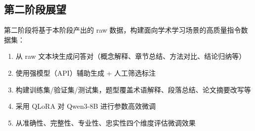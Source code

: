 \documentclass[12pt,a4paper]{ctexart}
\begin{document}
\subsection{第二阶段展望}

第二阶段将基于本阶段产出的 raw 数据，构建面向学术学习场景的高质量指令数据集：

\begin{enumerate}
    \item 从 raw 文本块生成问答对（概念解释、章节总结、方法对比、结论归纳等）
    \item 使用强模型（API）辅助生成 + 人工筛选标注
    \item 构建训练集/验证集/测试集，题型覆盖术语解释、段落总结、论文摘要改写等
    \item 采用 QLoRA 对 Qwen3-8B 进行参数高效微调
    \item 从准确性、完整性、专业性、忠实性四个维度评估微调效果
\end{enumerate}
\end{document}
